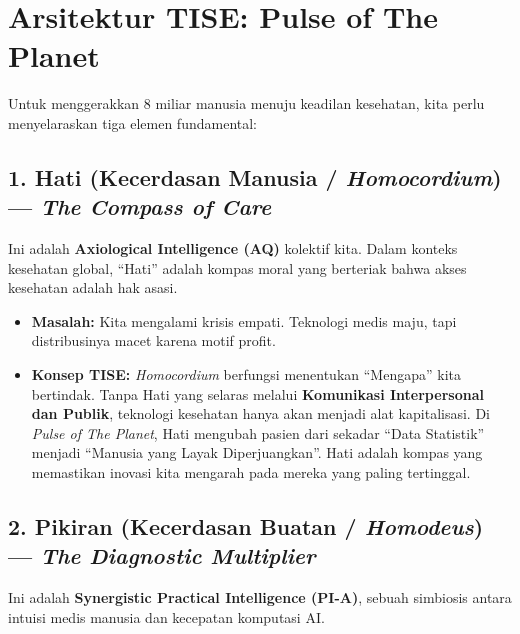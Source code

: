 \documentclass[
  letterpaper,
  DIV=11,
  numbers=noendperiod]{scrreprt}
\providecommand{\tightlist}{%
  \setlength{\itemsep}{0pt}\setlength{\parskip}{0pt}}
\begin{document}
\section{Arsitektur TISE: Pulse of The
Planet}\label{arsitektur-tise-pulse-of-the-planet}

Untuk menggerakkan 8 miliar manusia menuju keadilan kesehatan, kita
perlu menyelaraskan tiga elemen fundamental:

\subsection{\texorpdfstring{1. Hati (Kecerdasan Manusia /
\emph{Homocordium}) --- \emph{The Compass of
Care}}{1. Hati (Kecerdasan Manusia / Homocordium) --- The Compass of Care}}\label{hati-kecerdasan-manusia-homocordium-the-compass-of-care}

Ini adalah \textbf{Axiological Intelligence (AQ)} kolektif kita. Dalam
konteks kesehatan global, ``Hati'' adalah kompas moral yang berteriak
bahwa akses kesehatan adalah hak asasi.

\begin{itemize}
\tightlist
\item
  \textbf{Masalah:} Kita mengalami krisis empati. Teknologi medis maju,
  tapi distribusinya macet karena motif profit.
\item
  \textbf{Konsep TISE:} \emph{Homocordium} berfungsi menentukan
  ``Mengapa'' kita bertindak. Tanpa Hati yang selaras melalui
  \textbf{Komunikasi Interpersonal dan Publik}, teknologi kesehatan
  hanya akan menjadi alat kapitalisasi. Di \emph{Pulse of The Planet},
  Hati mengubah pasien dari sekadar ``Data Statistik'' menjadi ``Manusia
  yang Layak Diperjuangkan''. Hati adalah kompas yang memastikan inovasi
  kita mengarah pada mereka yang paling tertinggal.
\end{itemize}

\subsection{\texorpdfstring{2. Pikiran (Kecerdasan Buatan /
\emph{Homodeus}) --- \emph{The Diagnostic
Multiplier}}{2. Pikiran (Kecerdasan Buatan / Homodeus) --- The Diagnostic Multiplier}}\label{pikiran-kecerdasan-buatan-homodeus-the-diagnostic-multiplier}

Ini adalah \textbf{Synergistic Practical Intelligence (PI-A)}, sebuah
simbiosis antara intuisi medis manusia dan kecepatan komputasi AI.
\end{document}
